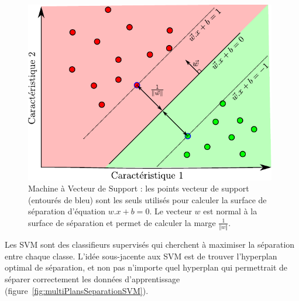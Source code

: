 \begin{figure}[h]
	\begin{center}
	\includegraphics[width=11cm]{images/SVM}
	\end{center}
	\caption[Machine à Vecteur de Support]{Machine à Vecteur de Support : les points vecteur de support (entourés de bleu) sont les seuls utilisés pour calculer la surface de séparation d'équation $w . x + b = 0$. Le vecteur $w$ est normal à la surface de séparation et permet de calculer la marge $\frac{1}{\Vert w \Vert}$.}
	\label{fig:SVM}
\end{figure}


Les SVM sont des classifieurs supervisés qui cherchent à maximiser la séparation entre chaque classe. L'idée sous-jacente aux SVM est de trouver l'hyperplan optimal de séparation, et non pas n'importe quel hyperplan qui permettrait de séparer correctement les données d'apprentissage (figure~\ref{fig:multiPlansSeparationSVM}). 


